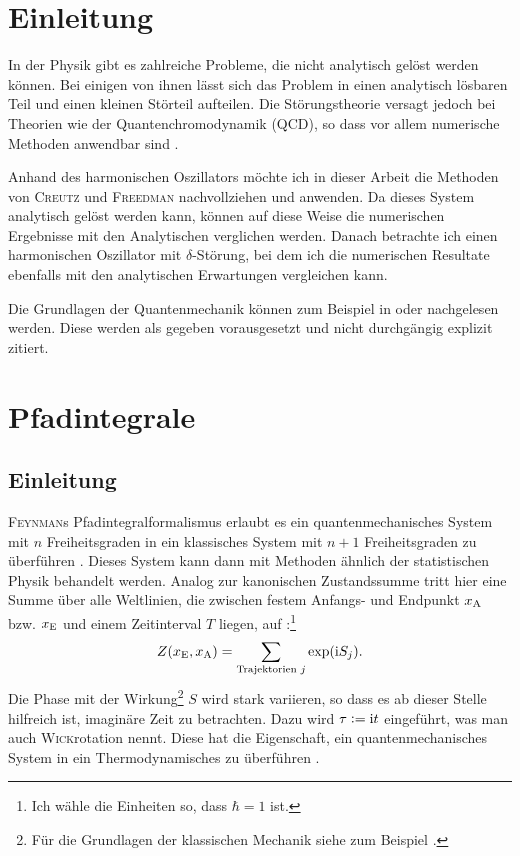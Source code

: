 
\chapter{Einleitung}

In der Physik gibt es zahlreiche Probleme, die nicht analytisch gelöst werden
können. Bei einigen von ihnen lässt sich das Problem in einen analytisch
lösbaren Teil und einen kleinen Störteil aufteilen. Die Störungstheorie versagt
jedoch bei Theorien wie der Quantenchromodynamik (QCD), so dass vor allem
numerische Methoden anwendbar sind \parencite{Wittig/Farbdynamik_Gitter}.

Anhand des harmonischen Oszillators möchte ich in dieser Arbeit die Methoden
von \textsc{Creutz} und \textsc{Freedman} nachvollziehen und anwenden. Da
dieses System analytisch gelöst werden kann, können auf diese Weise die
numerischen Ergebnisse mit den Analytischen verglichen werden. Danach betrachte
ich einen harmonischen Oszillator mit $\delta$-Störung, bei dem ich die
numerischen Resultate ebenfalls mit den analytischen Erwartungen vergleichen
kann.

Die Grundlagen der Quantenmechanik können zum Beispiel in
\parencite{Schwabl/Quantenmechanik} oder \parencite{nolting-theo5} nachgelesen
werden. Diese werden als gegeben vorausgesetzt und nicht durchgängig explizit
zitiert.

\chapter{Pfadintegrale}

\section{Einleitung}

\textsc{Feynman}s Pfadintegralformalismus erlaubt es ein quantenmechanisches
System mit $n$ Freiheitsgraden in ein klassisches System mit $n+1$
Freiheitsgraden zu überführen
\parencite[§12.4]{Thijssen/Computational_Physics}. Dieses System kann dann mit
Methoden ähnlich der statistischen Physik behandelt werden. Analog zur
kanonischen Zustandssumme tritt hier eine Summe über alle Weltlinien, die
zwischen festem Anfangs- und Endpunkt $x_\text A$ bzw. $x_\text E$ und einem
Zeitinterval $T$ liegen, auf
\parencite[(2.7)]{Creutz/Statistical_Approach_QM}:\footnote {Ich wähle die
Einheiten so, dass $\hbar = 1$ ist.}
\[
    Z(x_\text E, x_\text A) = \sum_{\text{Trajektorien $j$}} \exp(\mathrm i S_j).
\]
Die Phase mit der Wirkung\footnote{Für die Grundlagen der klassischen Mechanik
siehe zum Beispiel \parencite{Kuypers/Mechanik}.} $S$ wird stark variieren, so
dass es ab dieser Stelle hilfreich ist, imaginäre Zeit zu betrachten. Dazu wird
$\tau := \mathrm i t$ eingeführt, was man auch \textsc{Wick}rotation nennt. Diese
hat die Eigenschaft, ein quantenmechanisches System in ein Thermodynamisches zu
überführen \parencite[24]{Stetz/AQT}.

